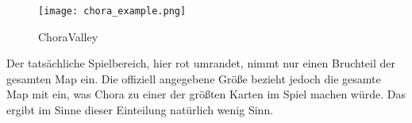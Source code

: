\begin{figure}[htbp]
    \centering
    \texttt{[image: chora\_example.png]}
    \caption{ChoraValley}
\end{figure}
Der tatsächliche Spielbereich, hier rot umrandet, nimmt nur einen Bruchteil der gesamten Map ein.\newline
Die offiziell angegebene Größe bezieht jedoch die gesamte Map mit ein, was Chora zu einer der größten Karten im Spiel machen würde.
Das ergibt im Sinne dieser Einteilung natürlich wenig Sinn.